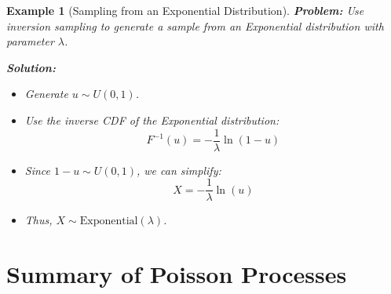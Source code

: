 \documentclass[12pt]{article}
\newtheorem{example}{Example}
\begin{document}
\begin{example}[Sampling from an Exponential Distribution]
    \textbf{Problem:} Use inversion sampling to generate a sample from an Exponential distribution with parameter \( \lambda \).
    
    \textbf{Solution:}
    \begin{itemize}
        \item Generate \( u \sim U(0, 1) \).
        \item Use the inverse CDF of the Exponential distribution:
        \[
        F^{-1}(u) = -\frac{1}{\lambda} \ln(1 - u)
        \]
        \item Since \( 1 - u \sim U(0, 1) \), we can simplify:
        \[
        X = -\frac{1}{\lambda} \ln(u)
        \]
        \item Thus, \( X \sim \text{Exponential}(\lambda) \).
    \end{itemize}
\end{example}

\section{Summary of Poisson Processes}
\end{document}
